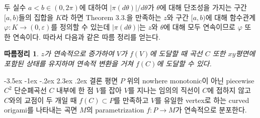 \documentclass[11pt]{article}
\makeatletter
\renewcommand\section{\@startsection {section}{1}{\z@}%
                                   {-3.5ex \@plus -1ex \@minus -.2ex}%
                                   {2.3ex \@plus.2ex}%
                                   {\normalfont\large\sffamily\bfseries}}
\newtheorem{corollary}{따름정리}
\makeatother
\begin{document}
두 실수 $a<b \in (0,2\pi)$에 대하여 $|\pi(d\theta)|/d\theta$가 $\theta$에 대해 단조성을 가지는 구간 $[a,b)$들의 집합을 $K$라 하면 Theorem 3.3.을 만족하는 $z$와 구간 $[a,b)$에 대해 함수관계 $\varphi:K\to (0,\varepsilon)$를 정의할 수 있는데 $|\pi(d\theta)|$는 $z$와 $\theta$에 대해 모두 연속이므로 $\varphi$ 또한 연속이다. 따라서 다음과 같은 따름 정리를 얻는다.


\begin{corollary}
$z$가 연속적으로 증가하여 $V$가 $f(V)$에 도달할 때 곡선 $C$ 또한 $xy$평면에 포함된 상태를 유지하며 연속적 변환을 거쳐 $f(C)$에 도달할 수 있다.
\end{corollary}

\section{결론}
평면 $P$ 위의 nowhere monotonic이 아닌 piecewise $C^2$ 단순폐곡선 $C$ 내부에 한 점 $V$를 잡아 $V$를 지나는 임의의 직선이 $C$에 접하지 않고 $C$와의 교점이 두 개일 때 $f(C)\subset P$를 만족하고 $V$를 유일한 vertex로 하는 curved origami를 나타내는 곡면 $M$의 parametrization $f:P\to M$가 연속적으로 분포한다.





\end{document}
